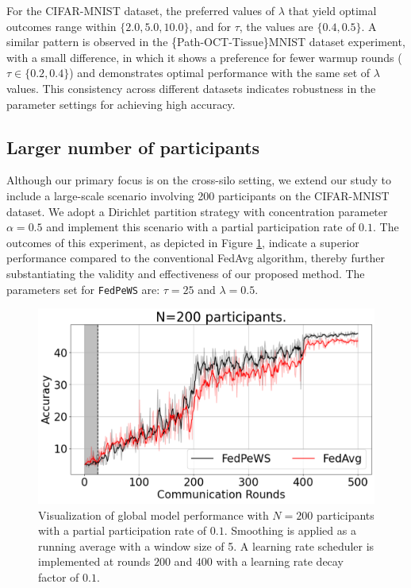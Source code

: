 \documentclass{article}
\begin{document}
 
 

For the CIFAR-MNIST dataset, the preferred values of $\lambda$ that yield optimal outcomes range within $\{2.0, 5.0, 10.0\}$, and for $\tau$, the values are $\{0.4, 0.5\}$. A similar pattern is observed in the \{Path-OCT-Tissue\}MNIST dataset experiment, with a small difference, in which it shows a preference for fewer warmup rounds ($\tau \in \{0.2, 0.4\}$) and demonstrates optimal performance with the same set of $\lambda$ values. This consistency across different datasets indicates robustness in the parameter settings for achieving high accuracy.                                            


\subsection{Larger number of participants} 
Although our primary focus is on the cross-silo setting, we extend our study to include a large-scale scenario involving 200 participants on the CIFAR-MNIST dataset. We adopt a Dirichlet partition strategy with concentration parameter $\alpha=0.5$ and implement this scenario with a partial participation rate of $0.1$. The outcomes of this experiment, as depicted in Figure \ref{fig: cifar-mnist-n200}, indicate a superior performance compared to the conventional FedAvg algorithm, thereby further substantiating the validity and effectiveness of our proposed method. The parameters set for \texttt{FedPeWS} are: $\tau=25$ and $\lambda=0.5$. 

\begin{figure}[t]
    \centering
    \includegraphics[width=0.6\linewidth]{images/cifar-mnist-n200.pdf}
    \caption{Visualization of global model performance with $N=200$ participants with a partial participation rate of $0.1$. Smoothing is applied as a running average with a window size of 5. A learning rate scheduler is implemented at rounds $200$ and $400$ with a learning rate decay factor of $0.1$.} 
    \label{fig: cifar-mnist-n200}
\end{figure} 
\end{document}

